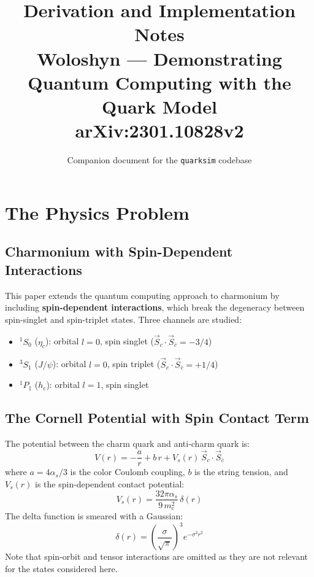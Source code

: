 \documentclass[11pt,a4paper]{article}
\title{Derivation and Implementation Notes\\
\large Woloshyn --- Demonstrating Quantum Computing with the Quark Model\\
\normalsize arXiv:2301.10828v2}
\author{Companion document for the \texttt{quarksim} codebase}
\date{}
\begin{document}
\maketitle

\tableofcontents
\newpage

\section{The Physics Problem}

\subsection{Charmonium with Spin-Dependent Interactions}

This paper extends the quantum computing approach to charmonium by including \textbf{spin-dependent interactions}, which break the degeneracy between spin-singlet and spin-triplet states. Three channels are studied:
\begin{itemize}[nosep]
  \item ${}^1S_0$ (\textbf{$\eta_c$}): orbital $l=0$, spin singlet ($\vec{S}_c \cdot \vec{S}_{\bar{c}} = -3/4$)
  \item ${}^3S_1$ (\textbf{$J/\psi$}): orbital $l=0$, spin triplet ($\vec{S}_c \cdot \vec{S}_{\bar{c}} = +1/4$)
  \item ${}^1P_1$ (\textbf{$h_c$}): orbital $l=1$, spin singlet
\end{itemize}

\subsection{The Cornell Potential with Spin Contact Term}

The potential between the charm quark and anti-charm quark is:
\begin{equation}
  V(r) = -\frac{a}{r} + b\,r + V_s(r)\,\vec{S}_c \cdot \vec{S}_{\bar{c}}
  \label{eq:cornell}
\end{equation}
where $a = 4\alpha_s/3$ is the color Coulomb coupling, $b$ is the string tension, and $V_s(r)$ is the spin-dependent contact potential:
\begin{equation}
  V_s(r) = \frac{32\pi\alpha_s}{9\,m_c^2}\,\delta(r)
  \label{eq:spin_contact}
\end{equation}
The delta function is smeared with a Gaussian:
\begin{equation}
  \delta(r) = \left(\frac{\sigma}{\sqrt{\pi}}\right)^3 e^{-\sigma^2 r^2}
\end{equation}
Note that spin-orbit and tensor interactions are omitted as they are not relevant for the states considered here.
\end{document}
